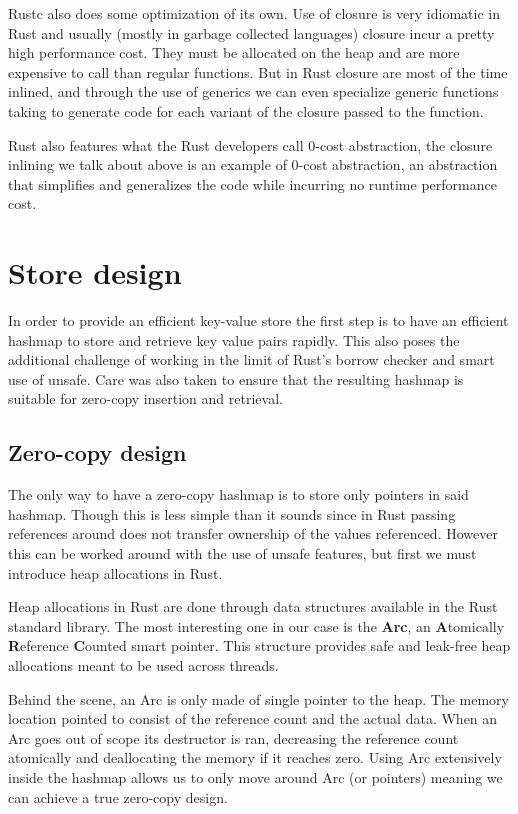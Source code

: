\documentclass[11pt]{article}
\begin{document}
Rustc also does some optimization of its own. Use of closure is very
idiomatic in Rust and usually (mostly in garbage collected languages)
closure incur a pretty high performance cost. They must be allocated
on the heap and are more expensive to call than regular functions. But
in Rust closure are most of the time inlined, and through the use of
generics we can even specialize generic functions taking to generate
code for each variant of the closure passed to the function.

Rust also features what the Rust developers call 0-cost abstraction,
the closure inlining we talk about above is an example of 0-cost
abstraction, an abstraction that simplifies and generalizes the code
while incurring no runtime performance cost.

\section{Store design}
In order to provide an efficient key-value store the first step is to
have an efficient hashmap to store and retrieve key value pairs
rapidly. This also poses the additional challenge of working in the
limit of Rust's borrow checker and smart use of unsafe. Care was also
taken to ensure that the resulting hashmap is suitable for zero-copy
insertion and retrieval.

\subsection{Zero-copy design}
The only way to have a zero-copy hashmap is to store only pointers in
said hashmap. Though this is less simple than it sounds since in Rust
passing references around does not transfer ownership of the values
referenced. However this can be worked around with the use of unsafe
features, but first we must introduce heap allocations in Rust.

Heap allocations in Rust are done through data structures available
in the Rust standard library. The most interesting one in our case is
the \textbf{Arc}, an \textbf{A}tomically \textbf{R}eference
\textbf{C}ounted smart pointer. This structure provides safe and
leak-free heap allocations meant to be used across threads.

Behind the scene, an Arc is only made of single pointer to the heap.
The memory location pointed to consist of the reference count and the
actual data. When an Arc goes out of scope its destructor is ran,
decreasing the reference count atomically and deallocating the memory
if it reaches zero. Using Arc extensively inside the hashmap allows
us to only move around Arc (or pointers) meaning we can achieve a true
zero-copy design.
\end{document}
